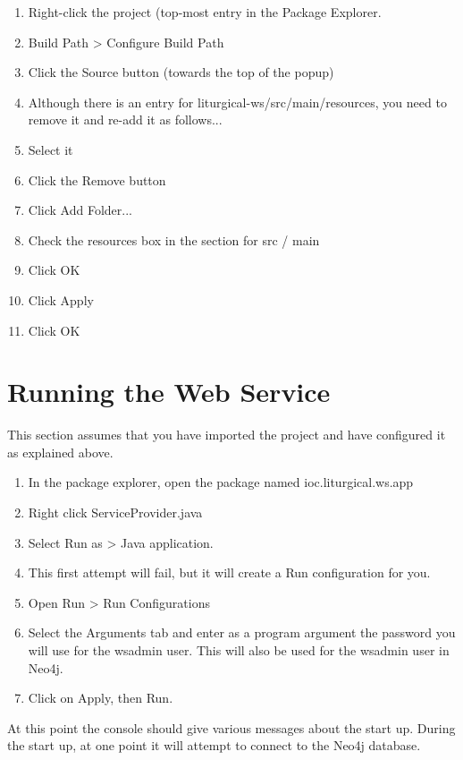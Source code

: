 \documentclass[]{memoir}
\begin{document}
\begin{enumerate}
    \item{Right-click the project (top-most entry in the Package Explorer}.
    \item {Build Path > Configure Build Path}
    \item{Click the Source button (towards the top of the popup)}
    \item{Although there is an entry for liturgical-ws/src/main/resources, you need to remove it and re-add it as follows...}
    \item{Select it}
    \item{Click the Remove button}
    \item{Click Add Folder...}
    \item{Check the resources box in the section for src / main}
    \item{Click OK}
    \item{Click Apply}
    \item{Click OK}
\end{enumerate}

\section{Running the Web Service}

This section assumes that you have imported the project and have configured it as explained above.

\begin{enumerate}
    \item{In the package explorer, open the package named ioc.liturgical.ws.app}
    \item{Right click ServiceProvider.java}
    \item{Select Run as > Java application.}
    \item{This first attempt will fail, but it will create a Run configuration for you.}
    \item{Open Run > Run Configurations}
    \item{Select the Arguments tab and enter as a program argument the password you will use for the wsadmin user.  This will also be used for the wsadmin user in Neo4j.}
    \item{Click on Apply, then Run.}
\end{enumerate}

At this point the console should give various messages about the start up.  During the start up, at one point it will attempt to connect to the Neo4j database.  
\end{document}
